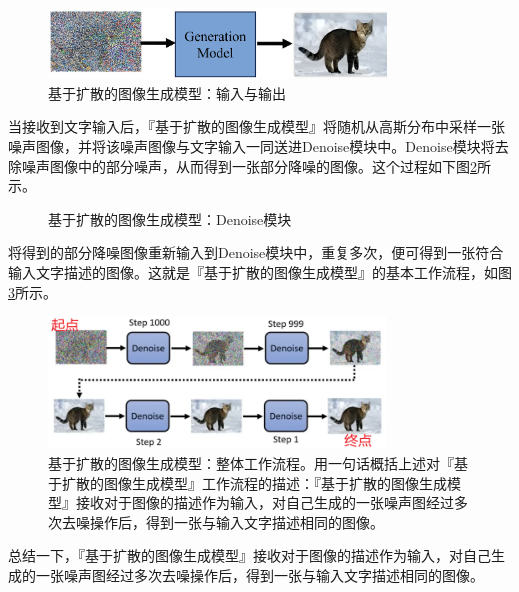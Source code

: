 \begin{figure}[htbp]
    \centering
    \includegraphics[width=0.8\textwidth]{figs/color/ioput_of_model.png}
    \caption{基于扩散的图像生成模型：输入与输出}
    \label{fig_ioput_of_model}
\end{figure}

当接收到文字输入后，『基于扩散的图像生成模型』将随机从高斯分布中采样一张噪声图像，并将该噪声图像与文字输入一同送进Denoise模块中。Denoise模块将去除噪声图像中的部分噪声，从而得到一张部分降噪的图像。这个过程如下图\ref{fig_denoise}所示。

\begin{figure}[htbp]
    \centering
    \caption{基于扩散的图像生成模型：Denoise模块}
    \label{fig_denoise}
\end{figure}


将得到的部分降噪图像重新输入到Denoise模块中，重复多次，便可得到一张符合输入文字描述的图像。这就是『基于扩散的图像生成模型』的基本工作流程，如图\ref{fig_process_of_model}所示。

\begin{figure}[htbp]
    \centering
    \includegraphics[width=0.8\textwidth]{figs/color/process.png}
    \caption{基于扩散的图像生成模型：整体工作流程。用一句话概括上述对『基于扩散的图像生成模型』工作流程的描述：『基于扩散的图像生成模型』接收对于图像的描述作为输入，对自己生成的一张噪声图经过多次去噪操作后，得到一张与输入文字描述相同的图像。}
    \label{fig_process_of_model}
\end{figure}

总结一下，『基于扩散的图像生成模型』接收对于图像的描述作为输入，对自己生成的一张噪声图经过多次去噪操作后，得到一张与输入文字描述相同的图像。


